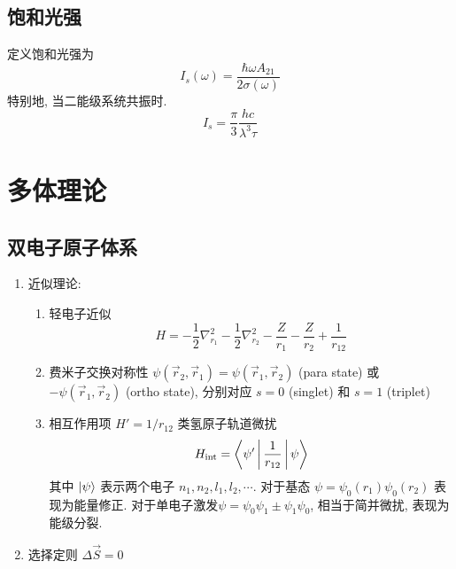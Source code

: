 \documentclass[10pt,a4paper,twocolumn]{article} %
\numberwithin{equation}{section} %
\begin{document}
\subsection{饱和光强} %
\label{sub:saturation_intensity}
定义饱和光强为
\begin{equation}
	I_s(\omega) = \frac{\hbar\omega A_{21}}{2\sigma(\omega)}
\end{equation}
特别地, 当二能级系统共振时. 
\begin{equation}
	I_s = \frac{\pi}{3}\frac{ hc}{\lambda^3 \tau}
\end{equation}
\section{多体理论} %
\label{sec:multibody}
\subsection{双电子原子体系} %
\label{sub:two_electron}
\begin{enumerate}
	\item 近似理论: 
	\begin{enumerate}
		\item 轻电子近似
		\begin{equation}
			H = -\frac 12 \nabla_{r_1}^2 - \frac 12\nabla_{r_2}^2
			-\frac{Z}{r_1} - \frac{Z}{r_2} + \frac{1}{r_{12}}
		\end{equation}
		\item 费米子交换对称性 $\psi(\vec r_2, \vec r_1) 
		= \psi(\vec r_1, \vec r_2)$ (para state) 或 $-\psi(\vec r_1, \vec r_2)$
		(ortho state), 分别对应 $s=0$ (singlet) 和 $s=1$ (triplet)
		\item 相互作用项 $H' = 1/r_{12}$ 类氢原子轨道微扰
		\begin{equation}
			H_{\mathrm{int}} = \Braket{\psi'|\frac{1}{r_{12}}|\psi}
		\end{equation}
		其中 $\ket{\psi}$ 表示两个电子 $n_1, n_2, l_1, l_2,\cdots$. 
		对于基态 $\psi = \psi_0(r_1)\psi_0(r_2)$ 表现为能量修正. 
		对于单电子激发$\psi = \psi_0\psi_1 \pm\psi_1\psi_0$, 相当于简并微扰, 
		表现为能级分裂.
	\end{enumerate}
	\item 选择定则 $\Delta\vec S = 0$
\end{enumerate}
\end{document}
